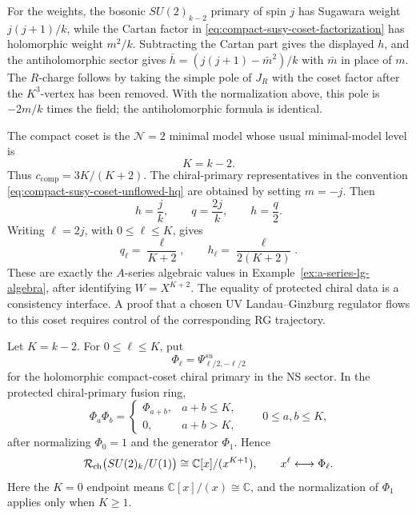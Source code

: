 For the weights, the bosonic \(SU(2)_{k-2}\) primary of spin \(j\) has
Sugawara weight \(j(j+1)/k\), while the Cartan factor in
\eqref{eq:compact-susy-coset-factorization} has holomorphic weight
\(m^2/k\).  Subtracting the Cartan part gives the displayed \(h\), and the
antiholomorphic sector gives \(\bar h=(j(j+1)-\bar m^2)/k\) with \(\bar m\)
in place of \(m\).  The \(R\)-charge follows by taking the
simple pole of \(J_R\) with the coset factor after the \(K^3\)-vertex has
been removed.  With the normalization above, this pole is
\(-2m/k\) times the field; the antiholomorphic formula is identical.

The compact coset is the \(\mathcal N=2\) minimal model whose usual
minimal-model level is
\[
  K=k-2 .
\]
Thus \(c_{\mathrm{comp}}=3K/(K+2)\).  The chiral-primary representatives in
the convention \eqref{eq:compact-susy-coset-unflowed-hq} are obtained by
setting \(m=-j\).  Then
\[
  h=\frac{j}{k},
  \qquad
  q=\frac{2j}{k},
  \qquad
  h=\frac q2 .
\]
Writing \(\ell=2j\), with \(0\le\ell\le K\), gives
\[
  q_\ell=\frac{\ell}{K+2},
  \qquad
  h_\ell=\frac{\ell}{2(K+2)}.
\]
These are exactly the \(A\)-series algebraic values in
Example~\ref{ex:a-series-lg-algebra}, after identifying
\(W=X^{K+2}\).  The equality of protected chiral data is a consistency
interface.  A proof that a chosen UV Landau--Ginzburg regulator flows to this
coset requires control of the corresponding RG trajectory.

\begin{proposition}
\label{prop:compact-susy-coset-chiral-ring}
Let \(K=k-2\).  For \(0\le \ell\le K\), put
\[
  \Phi_\ell=\Psi^{su}_{\ell/2,-\ell/2}
\]
for the holomorphic compact-coset chiral primary in the NS sector.  In the
protected chiral-primary fusion ring,
\begin{equation}
  \Phi_a\Phi_b=
  \begin{cases}
    \Phi_{a+b}, & a+b\le K,\\
    0, & a+b>K,
  \end{cases}
  \qquad
  0\le a,b\le K,
  \label{eq:compact-susy-coset-chiral-ring-product}
\end{equation}
after normalizing \(\Phi_0=1\) and the generator \(\Phi_1\).  Hence
\begin{equation}
  \mathcal R_{\rm ch}\bigl(SU(2)_k/U(1)\bigr)
  \cong
  \mathbb C[x]/(x^{K+1}),
  \qquad
  x^\ell\longleftrightarrow\Phi_\ell .
  \label{eq:compact-susy-coset-chiral-ring}
\end{equation}
Here the \(K=0\) endpoint means \(\mathbb C[x]/(x)\cong \mathbb C\), and the
normalization of \(\Phi_1\) applies only when \(K\ge1\).
\end{proposition}

